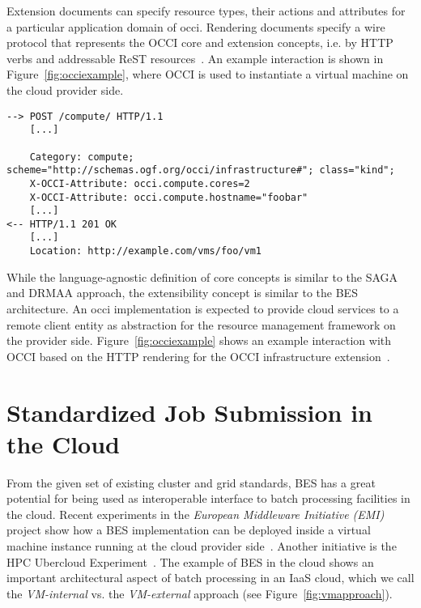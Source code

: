 \documentclass[twocolumn]{svjour3}       %
\begin{document}
Extension documents can specify resource types, their actions and attributes for a particular application domain of \gls{occi}. Rendering documents specify a wire protocol that represents the OCCI core and extension concepts, i.e. by HTTP verbs and addressable ReST resources~\cite{gfd185}. An example interaction is shown in Figure~\ref{fig:occiexample}, where OCCI is used to instantiate a virtual machine on the cloud provider side.

\begin{figure*}
\begin{lstlisting}
--> POST /compute/ HTTP/1.1 
    [...] 
    
    Category: compute; scheme="http://schemas.ogf.org/occi/infrastructure#"; class="kind"; 
    X-OCCI-Attribute: occi.compute.cores=2
    X-OCCI-Attribute: occi.compute.hostname="foobar" 
    [...]
<-- HTTP/1.1 201 OK 
    [...] 
    Location: http://example.com/vms/foo/vm1
\end{lstlisting}
\caption{Example: Creating a virtual machine instance}
\label{fig:occiexample} 
\end{figure*}


While the language-agnostic definition of core concepts is similar to the SAGA and DRMAA approach, the extensibility concept is similar to the BES architecture. An \gls{occi} implementation is expected to provide cloud services to a remote client entity as abstraction for the resource management framework on the provider side. Figure~\ref{fig:occiexample} shows an example interaction with OCCI based on the HTTP rendering for the OCCI infrastructure extension~\cite{citemaster_9271}.

\section{Standardized Job Submission in the Cloud}
\label{sec:occidrmaa}

From the given set of existing cluster and grid standards, BES has a great potential for being used as interoperable interface to batch processing facilities in the cloud. Recent experiments in the \emph{European Middleware Initiative (EMI)} project show how a BES implementation can be deployed inside a virtual machine instance running at the cloud provider side~\cite{emi_bes}. Another initiative is the HPC Ubercloud Experiment~\cite{citemaster_9647}. The example of BES in the cloud shows an important architectural aspect of batch processing in an IaaS cloud, which we call the \emph{VM-internal} vs. the \emph{VM-external} approach (see Figure~\ref{fig:vmapproach}).  
\end{document}

